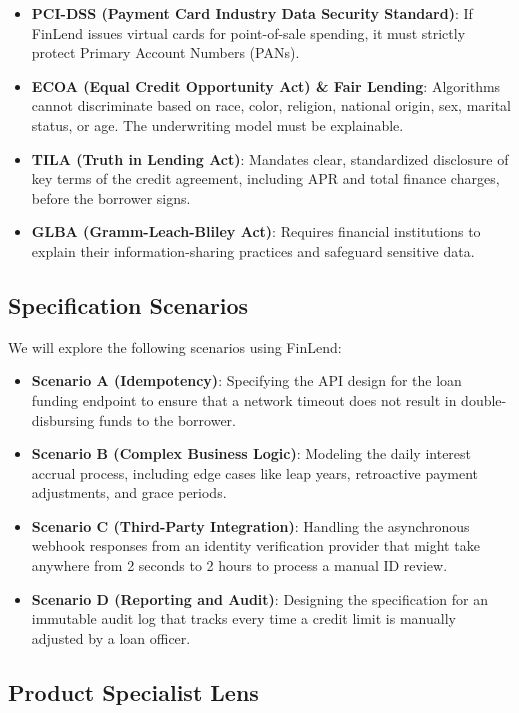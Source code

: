 \documentclass[
  11pt,
  openany,
  oneside]{book}
\providecommand{\tightlist}{%
  \setlength{\itemsep}{0pt}\setlength{\parskip}{0pt}}
\begin{document}
\begin{itemize}
\tightlist
\item
  \textbf{PCI-DSS (Payment Card Industry Data Security Standard)}: If
  FinLend issues virtual cards for point-of-sale spending, it must
  strictly protect Primary Account Numbers (PANs).
\item
  \textbf{ECOA (Equal Credit Opportunity Act) \& Fair Lending}:
  Algorithms cannot discriminate based on race, color, religion,
  national origin, sex, marital status, or age. The underwriting model
  must be explainable.
\item
  \textbf{TILA (Truth in Lending Act)}: Mandates clear, standardized
  disclosure of key terms of the credit agreement, including APR and
  total finance charges, before the borrower signs.
\item
  \textbf{GLBA (Gramm-Leach-Bliley Act)}: Requires financial
  institutions to explain their information-sharing practices and
  safeguard sensitive data.
\end{itemize}

\subsection{Specification Scenarios}\label{specification-scenarios-1}

We will explore the following scenarios using FinLend:

\begin{itemize}
\tightlist
\item
  \textbf{Scenario A (Idempotency)}: Specifying the API design for the
  loan funding endpoint to ensure that a network timeout does not result
  in double-disbursing funds to the borrower.
\item
  \textbf{Scenario B (Complex Business Logic)}: Modeling the daily
  interest accrual process, including edge cases like leap years,
  retroactive payment adjustments, and grace periods.
\item
  \textbf{Scenario C (Third-Party Integration)}: Handling the
  asynchronous webhook responses from an identity verification provider
  that might take anywhere from 2 seconds to 2 hours to process a manual
  ID review.
\item
  \textbf{Scenario D (Reporting and Audit)}: Designing the specification
  for an immutable audit log that tracks every time a credit limit is
  manually adjusted by a loan officer.
\end{itemize}

\subsection{Product Specialist Lens}\label{product-specialist-lens-1}
\end{document}
